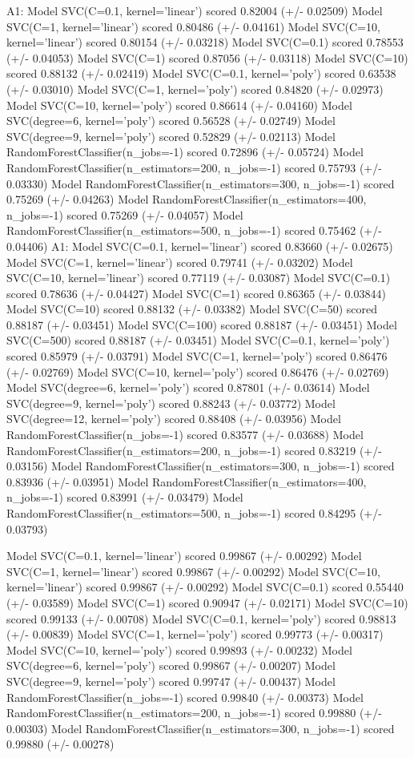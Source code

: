 \documentclass{article}
\begin{document}
\iffalse
A1:
Model SVC(C=0.1, kernel='linear') scored 0.82004 (+/- 0.02509)
Model SVC(C=1, kernel='linear') scored 0.80486 (+/- 0.04161)
Model SVC(C=10, kernel='linear') scored 0.80154 (+/- 0.03218)
Model SVC(C=0.1) scored 0.78553 (+/- 0.04053)
Model SVC(C=1) scored 0.87056 (+/- 0.03118)
Model SVC(C=10) scored 0.88132 (+/- 0.02419)
Model SVC(C=0.1, kernel='poly') scored 0.63538 (+/- 0.03010)
Model SVC(C=1, kernel='poly') scored 0.84820 (+/- 0.02973)
Model SVC(C=10, kernel='poly') scored 0.86614 (+/- 0.04160)
Model SVC(degree=6, kernel='poly') scored 0.56528 (+/- 0.02749)
Model SVC(degree=9, kernel='poly') scored 0.52829 (+/- 0.02113)
Model RandomForestClassifier(n_jobs=-1) scored 0.72896 (+/- 0.05724)
Model RandomForestClassifier(n_estimators=200, n_jobs=-1) scored 0.75793 (+/- 0.03330)
Model RandomForestClassifier(n_estimators=300, n_jobs=-1) scored 0.75269 (+/- 0.04263)
Model RandomForestClassifier(n_estimators=400, n_jobs=-1) scored 0.75269 (+/- 0.04057)
Model RandomForestClassifier(n_estimators=500, n_jobs=-1) scored 0.75462 (+/- 0.04406)
A1:
Model SVC(C=0.1, kernel='linear') scored 0.83660 (+/- 0.02675)
Model SVC(C=1, kernel='linear') scored 0.79741 (+/- 0.03202)
Model SVC(C=10, kernel='linear') scored 0.77119 (+/- 0.03087)
Model SVC(C=0.1) scored 0.78636 (+/- 0.04427)
Model SVC(C=1) scored 0.86365 (+/- 0.03844)
Model SVC(C=10) scored 0.88132 (+/- 0.03382)
Model SVC(C=50) scored 0.88187 (+/- 0.03451)
Model SVC(C=100) scored 0.88187 (+/- 0.03451)
Model SVC(C=500) scored 0.88187 (+/- 0.03451)
Model SVC(C=0.1, kernel='poly') scored 0.85979 (+/- 0.03791)
Model SVC(C=1, kernel='poly') scored 0.86476 (+/- 0.02769)
Model SVC(C=10, kernel='poly') scored 0.86476 (+/- 0.02769)
Model SVC(degree=6, kernel='poly') scored 0.87801 (+/- 0.03614)
Model SVC(degree=9, kernel='poly') scored 0.88243 (+/- 0.03772)
Model SVC(degree=12, kernel='poly') scored 0.88408 (+/- 0.03956)
Model RandomForestClassifier(n_jobs=-1) scored 0.83577 (+/- 0.03688)
Model RandomForestClassifier(n_estimators=200, n_jobs=-1) scored 0.83219 (+/- 0.03156)
Model RandomForestClassifier(n_estimators=300, n_jobs=-1) scored 0.83936 (+/- 0.03951)
Model RandomForestClassifier(n_estimators=400, n_jobs=-1) scored 0.83991 (+/- 0.03479)
Model RandomForestClassifier(n_estimators=500, n_jobs=-1) scored 0.84295 (+/- 0.03793)





Model SVC(C=0.1, kernel='linear') scored 0.99867 (+/- 0.00292)
Model SVC(C=1, kernel='linear') scored 0.99867 (+/- 0.00292)
Model SVC(C=10, kernel='linear') scored 0.99867 (+/- 0.00292)
Model SVC(C=0.1) scored 0.55440 (+/- 0.03589)
Model SVC(C=1) scored 0.90947 (+/- 0.02171)
Model SVC(C=10) scored 0.99133 (+/- 0.00708)
Model SVC(C=0.1, kernel='poly') scored 0.98813 (+/- 0.00839)
Model SVC(C=1, kernel='poly') scored 0.99773 (+/- 0.00317)
Model SVC(C=10, kernel='poly') scored 0.99893 (+/- 0.00232)
Model SVC(degree=6, kernel='poly') scored 0.99867 (+/- 0.00207)
Model SVC(degree=9, kernel='poly') scored 0.99747 (+/- 0.00437)
Model RandomForestClassifier(n_jobs=-1) scored 0.99840 (+/- 0.00373)
Model RandomForestClassifier(n_estimators=200, n_jobs=-1) scored 0.99880 (+/- 0.00303)
Model RandomForestClassifier(n_estimators=300, n_jobs=-1) scored 0.99880 (+/- 0.00278)
\end{document}
